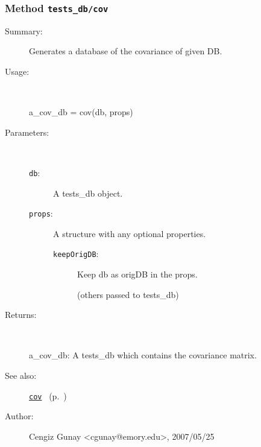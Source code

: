\subsubsection[Method \texttt{cov}]{Method \texttt{tests\_db/cov}}%
%
\label{ref_tests_db__cov}%
\hypertarget{ref_tests_db__cov}{}%
\begin{description}
\item[Summary:]Generates a database of the covariance of given DB.
%
\item[Usage:]~%
\begin{lyxcode}%
a\_cov\_db = cov(db, props)
%
\end{lyxcode}%
%
%
\item[Parameters:]~
\begin{description}%
\item[\texttt{db}:]
 A tests\_db object.
\item[\texttt{props}:]
 A structure with any optional properties.
\begin{description}%
\item[\texttt{keepOrigDB}:]
 Keep db as origDB in the props.

(others passed to tests\_db)
\end{description}%
\end{description}%
%
\item[Returns:
]~

	a\_cov\_db: A tests\_db which contains the covariance matrix.
%
%
\item[See also:]%
\hyperlink{ref_cov}{\texttt{cov}}%
\ (p.~\pageref{ref_cov})%
%
%
\item[Author:]%
Cengiz Gunay <cgunay@emory.edu>, 2007/05/25
%
\end{description}
\methodline%
